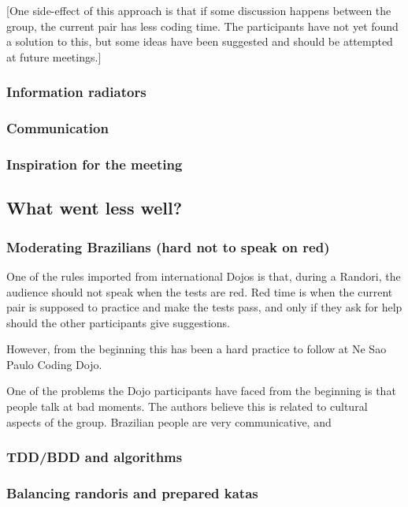 [One side-effect of this approach is that if some discussion happens
between the group, the current pair has less coding time. The
participants have not yet found a solution to this, but some ideas
have been suggested and should be attempted at future meetings.]

\subsubsection{Information radiators}

\subsubsection{Communication}

\subsubsection{Inspiration for the meeting}

\subsection{What went less well?}\label{ssub:less_well}

\subsubsection{Moderating Brazilians (hard not to speak on red)}

One of the rules imported from international Dojos is that, during a
Randori, the audience should not speak when the tests are red. Red
time is when the current pair is supposed to practice and make the
tests pass, and only if they ask for help should the other
participants give suggestions.

However, from the beginning this has been a hard practice to follow at
Ne Sao Paulo Coding Dojo.

One of the problems the Dojo participants have faced from the beginning
is that people talk at bad moments. The authors believe this is
related to cultural aspects of the group. Brazilian people are very
communicative, and 

\subsubsection{TDD/BDD and algorithms}

\subsubsection{Balancing randoris and prepared katas}

